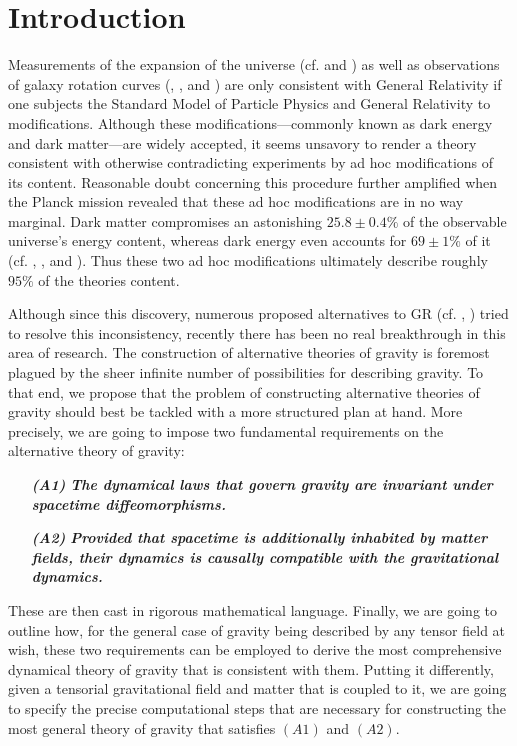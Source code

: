 \documentclass[%
preprint,
titlepage,
nofootinbib,
amsmath,amssymb,
showkeys,
aps,
prd,
floatfix,
]{revtex4-2}
\begin{document}
\section{Introduction}
Measurements of the expansion of the universe (cf. \cite{1999ApJ...517..565P} and \cite{1998AJ....116.1009R}) as well as observations of galaxy rotation curves (\cite{1970ApJ...160..811F}, \cite{1970ApJ...159..379R}, and \cite{1980ApJ...238..471R}) are only consistent with General Relativity if one subjects the Standard Model of Particle Physics and General Relativity to modifications. Although these modifications---commonly known as dark energy and dark matter---are widely accepted, it seems unsavory to render a theory consistent with otherwise contradicting experiments by ad hoc modifications of its content. Reasonable doubt concerning this procedure further amplified when the Planck mission revealed that these ad hoc modifications are in no way marginal. Dark matter compromises an astonishing $ 25.8\pm0.4\%$ of the observable universe's energy content, whereas dark energy even accounts for $ 69 \pm 1 \%$ of it (cf. \cite{Planck13_1}, \cite{Planck13_2}, \cite{Planck15} and \cite{Planck18}). Thus these two ad hoc modifications ultimately describe roughly $95\%$ of the theories content. 

Although since this discovery, numerous proposed alternatives to GR (cf. \cite{2013LRR....16....9Y}, \cite{fR2}) tried to resolve this inconsistency, recently there has been no real breakthrough in this area of research. The construction of alternative theories of gravity is foremost plagued by the sheer infinite number of possibilities for describing gravity. To that end, we propose that the problem of constructing alternative theories of gravity should best be tackled with a more structured plan at hand.
More precisely, we are going to impose two fundamental requirements on the alternative theory of gravity: 
\begin{itemize}
    \item[\textbf{\textit{(A1)}}] \textbf{\textit{The dynamical laws that govern gravity are invariant under spacetime diffeomorphisms.}}
    \item[\textbf{\textit{(A2)}}] \textbf{\textit{Provided that spacetime is additionally inhabited by matter fields, their dynamics is causally compatible with the gravitational dynamics.}}
\end{itemize}
These are then cast in rigorous mathematical language.
Finally, we are going to outline how, for the general case of gravity being described by any tensor field at wish, these two requirements can be employed to derive the most comprehensive dynamical theory of gravity that is consistent with them.
Putting it differently, given a tensorial gravitational field and matter that is coupled to it, we are going to specify the precise computational steps that are necessary for constructing the most general theory of gravity that satisfies $(A1)$ and $(A2)$.
\end{document}
